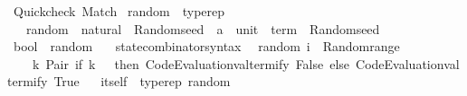\begin{isabellebody}
\isanewline
{}\isamarkupfalse%
\ Quickcheck\ Match%
\isadelimdocument
%
\endisadelimdocument
%
\isatagdocument
%
\isamarkuptrue%
%
\endisatagdocument
{\isafolddocument}%
%
\isadelimdocument
%
\endisadelimdocument
{}\isamarkupfalse%
\ random\ {\isacharequal}{\kern0pt}\ typerep\ {\isacharplus}{\kern0pt}\isanewline
\ \ \ random\ {\isacharcolon}{\kern0pt}{\isacharcolon}{\kern0pt}\ {\isachardoublequoteopen}natural\ {\isasymRightarrow}\ Random{\isachardot}{\kern0pt}seed\ {\isasymRightarrow}\ {\isacharparenleft}{\kern0pt}{\isacharprime}{\kern0pt}a\ {\isasymtimes}\ {\isacharparenleft}{\kern0pt}unit\ {\isasymRightarrow}\ term{\isacharparenright}{\kern0pt}{\isacharparenright}{\kern0pt}\ {\isasymtimes}\ Random{\isachardot}{\kern0pt}seed{\isachardoublequoteclose}%
\isadelimdocument
%
\endisadelimdocument
%
\isatagdocument
%
\isamarkuptrue%
%
\endisatagdocument
{\isafolddocument}%
%
\isadelimdocument
%
\endisadelimdocument
{}\isamarkupfalse%
\ bool\ {\isacharcolon}{\kern0pt}{\isacharcolon}{\kern0pt}\ random\isanewline
{}\isanewline
\isanewline
{}\isamarkupfalse%
\isanewline
\ \ \ state{\isacharunderscore}{\kern0pt}combinator{\isacharunderscore}{\kern0pt}syntax\isanewline
{}\isanewline
\isanewline
{}\isamarkupfalse%
\isanewline
\ \ {\isachardoublequoteopen}random\ i\ {\isacharequal}{\kern0pt}\ Random{\isachardot}{\kern0pt}range\ {}\ {\isasymcirc}{\isasymrightarrow}\isanewline
\ \ \ \ {\isacharparenleft}{\kern0pt}{\isasymlambda}k{\isachardot}{\kern0pt}\ Pair\ {\isacharparenleft}{\kern0pt}if\ k\ {\isacharequal}{\kern0pt}\ {}\ then\ Code{\isacharunderscore}{\kern0pt}Evaluation{\isachardot}{\kern0pt}valtermify\ False\ else\ Code{\isacharunderscore}{\kern0pt}Evaluation{\isachardot}{\kern0pt}valtermify\ True{\isacharparenright}{\kern0pt}{\isacharparenright}{\kern0pt}{\isachardoublequoteclose}\isanewline
\isanewline
{}\isamarkupfalse%
%
\isadelimproof
\ %
\endisadelimproof
%
\isatagproof
\isacommand{{\isachardot}{\kern0pt}{\isachardot}{\kern0pt}}\isamarkupfalse%
%
\endisatagproof
{\isafoldproof}%
%
\isadelimproof
%
\endisadelimproof
\isanewline
\isanewline
{}\isamarkupfalse%
\isanewline
\isanewline
{}\isamarkupfalse%
\isanewline
\isanewline
{}\isamarkupfalse%
\ itself\ {\isacharcolon}{\kern0pt}{\isacharcolon}{\kern0pt}\ {\isacharparenleft}{\kern0pt}typerep{\isacharparenright}{\kern0pt}\ random\isanewline

\end{isabellebody}
